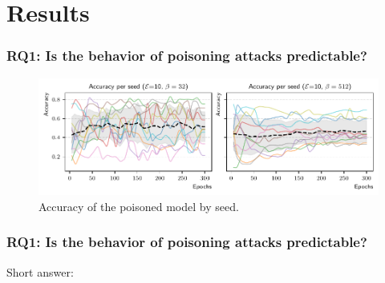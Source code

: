 \documentclass[color,t,presentation,english,aspectratio=169]{beamer}
\begin{document}


\section{Results}

\begin{frame}
\frametitle{RQ1: Is the behavior of poisoning attacks predictable?}
\begin{figure}
	\centering
	\includegraphics[width=.8\textwidth]{figures/predictability-all.pdf}
	\caption{Accuracy of the poisoned model by seed.}
\end{figure}
\end{frame}


\begin{frame}
	\frametitle{RQ1: Is the behavior of poisoning attacks predictable?}

	Short answer: \onslide<2->{Nope.}

	\vspace{1\baselineskip}

\end{frame}
\end{document}
